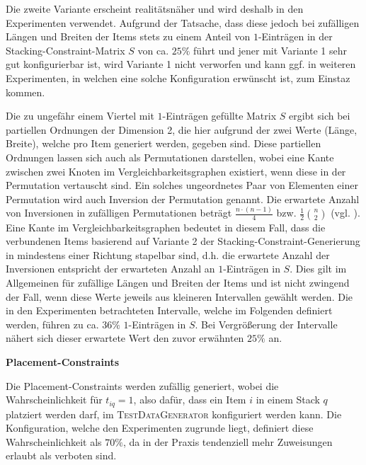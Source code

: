 Die zweite Variante erscheint realitätsnäher und wird deshalb in den Experimenten verwendet.
Aufgrund der Tatsache, dass diese jedoch bei zufälligen Längen und Breiten der Items stets zu einem Anteil
von $1$-Einträgen in der Stacking-Constraint-Matrix $S$ von ca. $25\%$ führt und jener mit Variante 1 sehr gut
konfigurierbar ist, wird Variante 1 nicht verworfen und kann ggf. in weiteren Experimenten, in welchen eine
solche Konfiguration erwünscht ist, zum Einstaz kommen.

Die zu ungefähr einem Viertel mit $1$-Einträgen gefüllte Matrix $S$ ergibt sich bei partiellen Ordnungen der Dimension 2,
die hier aufgrund der zwei Werte (Länge, Breite), welche pro Item generiert werden, gegeben sind.
Diese partiellen Ordnungen lassen sich auch als Permutationen darstellen, wobei eine Kante zwischen
zwei Knoten im Vergleichbarkeitsgraphen existiert, wenn diese in der Permutation
vertauscht sind. Ein solches ungeordnetes Paar von Elementen einer Permutation wird auch Inversion
der Permutation genannt. Die erwartete Anzahl von Inversionen in zufälligen Permutationen
beträgt $\frac{n \cdot (n - 1)}{4}$ bzw. $\frac{1}{2} \binom{n}{2}$ (vgl. \citet{Heuberger2012}).
Eine Kante im Vergleichbarkeitsgraphen bedeutet in diesem Fall, dass die verbundenen Items
basierend auf Variante 2 der Stacking-Constraint-Generierung in mindestens einer Richtung stapelbar sind,
d.h. die erwartete Anzahl der Inversionen entspricht der erwarteten Anzahl an $1$-Einträgen in $S$.
Dies gilt im Allgemeinen für zufällige Längen und Breiten der Items und ist nicht zwingend der Fall,
wenn diese Werte jeweils aus kleineren Intervallen gewählt werden.
Die in den Experimenten betrachteten Intervalle, welche im Folgenden definiert werden,
führen zu ca. $36\%$ $1$-Einträgen in $S$. Bei Vergrößerung der Intervalle nähert sich dieser
erwartete Wert den zuvor erwähnten $25\%$ an.


\textbf{Placement-Constraints}

Die Placement-Constraints werden zufällig generiert, wobei die Wahrscheinlichkeit für $t_{iq} = 1$, also dafür,
dass ein Item $i$ in einem Stack $q$ platziert werden darf, im \textsc{TestDataGenerator} konfiguriert werden kann.
Die Konfiguration, welche den Experimenten zugrunde liegt, definiert diese Wahrscheinlichkeit
als $70 \%$, da in der Praxis tendenziell mehr Zuweisungen erlaubt als verboten sind.

\pagebreak

